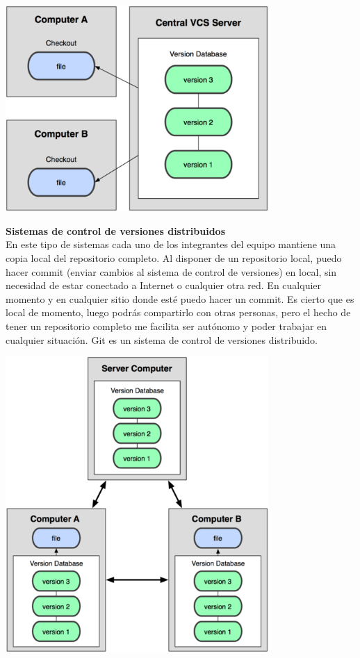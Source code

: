 \begin{center}
\includegraphics[width=10cm]{./Imagenes/centralizado} 
\end{center}

\begin{itemize}
\textbf{Sistemas de control de versiones distribuidos}\\
En este tipo de sistemas cada uno de los integrantes del equipo mantiene una copia local del repositorio completo. Al disponer de un repositorio local, puedo hacer commit (enviar cambios al sistema de control de versiones) en local, sin necesidad de estar conectado a Internet o cualquier otra red. En cualquier momento y en cualquier sitio donde esté puedo hacer un commit. Es cierto que es local de momento, luego podrás compartirlo con otras personas, pero el hecho de tener un repositorio completo me facilita ser autónomo y poder trabajar en cualquier situación. Git es un sistema de control de versiones distribuido.
\end{itemize}

\begin{center}
\includegraphics[width=10cm]{./Imagenes/distribuido} 
\end{center}
